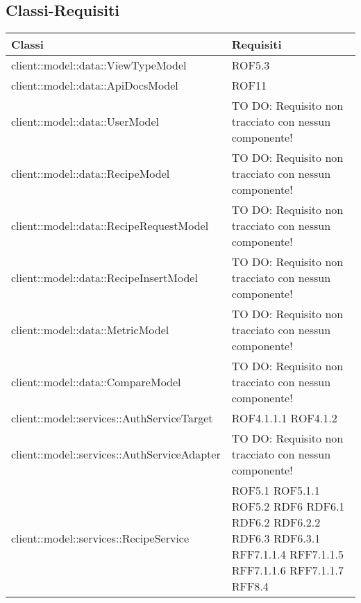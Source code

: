 \subsection{Classi-Requisiti} %
\label{sub:classi_requisiti}
\begin{center}
\def\arraystretch{1.5}
\bgroup
\begin{longtable}{| p{11cm} | p{2.5cm} |}
\hline
\textbf{Classi} & \textbf{Requisiti} \\
\hline
client::model::data::ViewTypeModel & ROF5.3 \\
\hline
client::model::data::ApiDocsModel & ROF11 \\
\hline
client::model::data::UserModel & TO DO: Requisito non tracciato con nessun componente! \\
\hline
client::model::data::RecipeModel & TO DO: Requisito non tracciato con nessun componente! \\
\hline
client::model::data::RecipeRequestModel & TO DO: Requisito non tracciato con nessun componente! \\
\hline
client::model::data::RecipeInsertModel & TO DO: Requisito non tracciato con nessun componente! \\
\hline
client::model::data::MetricModel & TO DO: Requisito non tracciato con nessun componente! \\
\hline
client::model::data::CompareModel & TO DO: Requisito non tracciato con nessun componente! \\
\hline
client::model::services::AuthServiceTarget & ROF4.1.1.1 \newline ROF4.1.2 \\
\hline
client::model::services::AuthServiceAdapter & TO DO: Requisito non tracciato con nessun componente! \\
\hline
client::model::services::RecipeService & ROF5.1 \newline ROF5.1.1 \newline ROF5.2 \newline RDF6 \newline RDF6.1 \newline RDF6.2 \newline RDF6.2.2 \newline RDF6.3 \newline RDF6.3.1 \newline RFF7.1.1.4 \newline RFF7.1.1.5 \newline RFF7.1.1.6 \newline RFF7.1.1.7 \newline RFF8.4 \\

\end{longtable}
\end{center}
